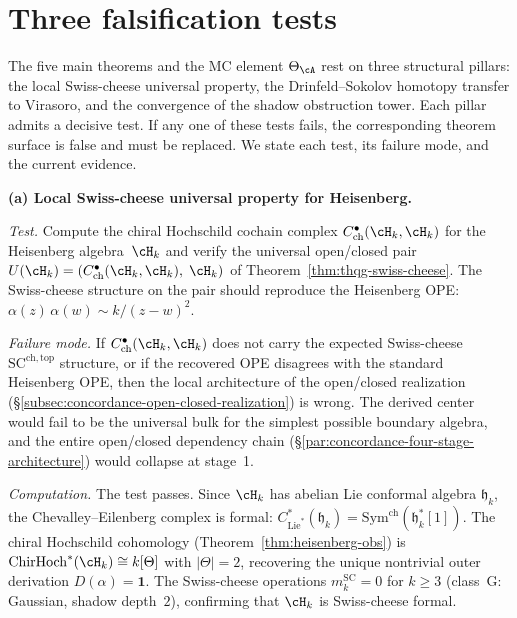 \section{Three falsification tests}
\label{sec:concordance-falsification-tests}

The five main theorems and the MC element
$\Theta_\cA$ rest on three structural pillars:
the local Swiss-cheese universal property,
the Drinfeld--Sokolov homotopy transfer to
Virasoro, and the convergence of the shadow obstruction tower.
Each pillar admits a decisive test.
If any one of these tests fails, the corresponding
theorem surface is false and must be replaced. We state each test, its
failure mode, and the current evidence.

\medskip
\noindent
\textbf{(a) Local Swiss-cheese universal property for Heisenberg.}

\smallskip\noindent
\emph{Test.}\enspace
Compute the chiral Hochschild cochain complex
$C^\bullet_{\mathrm{ch}}(\cH_k, \cH_k)$
for the Heisenberg algebra~$\cH_k$ and verify the
universal open/closed pair
$U(\cH_k) = (C^\bullet_{\mathrm{ch}}(\cH_k, \cH_k),\;
\cH_k)$
of Theorem~\ref{thm:thqg-swiss-cheese}.
The Swiss-cheese structure on the pair should
reproduce the Heisenberg OPE:
$\alpha(z)\,\alpha(w) \sim k/(z-w)^2$.

\smallskip\noindent
\emph{Failure mode.}\enspace
If $C^\bullet_{\mathrm{ch}}(\cH_k, \cH_k)$ does not
carry the expected Swiss-cheese $\mathrm{SC}^{\mathrm{ch,top}}$
structure, or if the recovered OPE disagrees with the
standard Heisenberg OPE, then the local architecture
of the open/closed realization
(\S\ref{subsec:concordance-open-closed-realization})
is wrong.
The derived center would fail to be the universal
bulk for the simplest possible boundary algebra,
and the entire open/closed dependency chain
(\S\ref{par:concordance-four-stage-architecture})
would collapse at stage~1.

\smallskip\noindent
\emph{Computation.}\enspace
The test passes.
Since $\cH_k$ has abelian Lie conformal algebra
$\mathfrak{h}_k$, the Chevalley--Eilenberg complex
is formal:
$C^*_{\mathrm{Lie}^*}(\mathfrak{h}_k)
= \mathrm{Sym}^{\mathrm{ch}}(\mathfrak{h}_k^*[1])$.
The chiral Hochschild cohomology
(Theorem~\ref{thm:heisenberg-obs})
is $\mathrm{ChirHoch}^*(\cH_k) \cong k[\Theta]$
with $|\Theta| = 2$, recovering the unique
nontrivial outer derivation $D(\alpha) = \mathbf{1}$.
The Swiss-cheese operations
$m_k^{\mathrm{SC}} = 0$ for $k \geq 3$
(class~G: Gaussian, shadow depth~$2$),
confirming that $\cH_k$ is Swiss-cheese formal.

